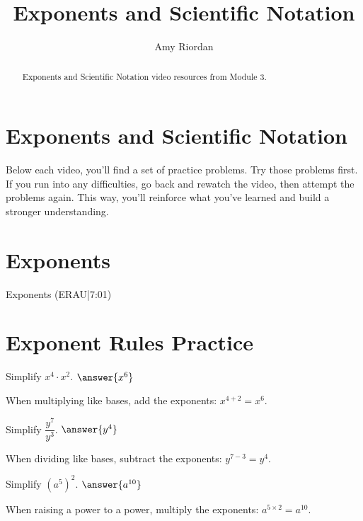\documentclass{ximera}
\title{Exponents and Scientific Notation}
\author{Amy Riordan}
\begin{document}
\begin{abstract}
Exponents and Scientific Notation video resources from Module 3.
\end{abstract}
\maketitle

\section*{Exponents and Scientific Notation}

Below each video, you’ll find a set of practice problems. Try those problems first. If you run into any difficulties, go back and rewatch the video, then attempt the problems again. This way, you’ll reinforce what you’ve learned and build a stronger understanding.

\section*{Exponents}

Exponents (ERAU|7:01)



\section*{Exponent Rules Practice}

\begin{problem}
Simplify $x^4 \cdot x^2$. $\answer{x^6}$
\begin{feedback}
When multiplying like bases, add the exponents: $x^{4+2} = x^6$.
\end{feedback}
\end{problem}

\begin{problem}
Simplify $\dfrac{y^7}{y^3}$. $\answer{y^4}$
\begin{feedback}
When dividing like bases, subtract the exponents: $y^{7-3} = y^4$.
\end{feedback}
\end{problem}

\begin{problem}
Simplify $(a^5)^2$. $\answer{a^{10}}$
\begin{feedback}
When raising a power to a power, multiply the exponents: $a^{5 \times 2} = a^{10}$.
\end{feedback}
\end{problem}
\end{document}
